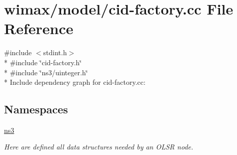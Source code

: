 \hypertarget{cid-factory_8cc}{}\section{wimax/model/cid-\/factory.cc File Reference}
\label{cid-factory_8cc}
{\ttfamily \#include $<$stdint.\+h$>$}\\*
{\ttfamily \#include \char`\"{}cid-\/factory.\+h\char`\"{}}\\*
{\ttfamily \#include \char`\"{}ns3/uinteger.\+h\char`\"{}}\\*
Include dependency graph for cid-\/factory.cc\+:
\subsection*{Namespaces}
\begin{DoxyCompactItemize}
\item 
 \hyperlink{namespacens3}{ns3}
\begin{DoxyCompactList}\small\item\em Here are defined all data structures needed by an O\+L\+SR node. \end{DoxyCompactList}\end{DoxyCompactItemize}

